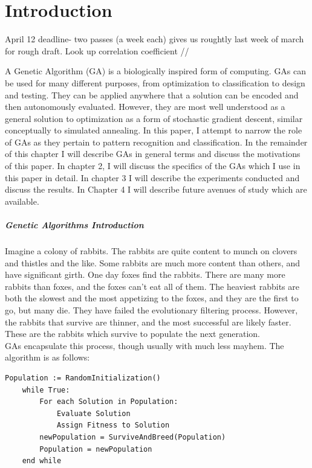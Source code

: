 \chapter{Introduction} \label{ch:introduction}

April 12 deadline- two passes (a week each) gives us roughtly last week of march for rough draft.  Look up correlation coefficient //

A Genetic Algorithm (GA) is a biologically inspired form of computing.  GAs can be used for many different purposes, from optimization to classification to design and testing.  They can be applied anywhere that a solution can be encoded and then autonomously evaluated.  However, they are most well understood as a general solution to optimization as a form of stochastic gradient descent, similar conceptually to simulated annealing. In this paper, I attempt to narrow the role of GAs as they pertain to pattern recognition and classification.  In the remainder of this chapter I will describe GAs in general terms and discuss the motivations of this paper.  In chapter 2, I will discuss the specifics of the GAs which I use in this paper in detail.  In chapter 3 I will describe the experiments conducted and discuss the results.  In Chapter 4 I will describe future avenues of study which are available. 
\paragraph{Genetic Algorithms Introduction}
Imagine a colony of rabbits.  The rabbits are quite content to munch on clovers and thistles and the like.  Some rabbits are much more content than others, and have significant girth.  One day foxes find the rabbits. There are many more rabbits than foxes, and the foxes can't eat all of them.  The heaviest rabbits are both the slowest and the most appetizing to the foxes, and they are the first to go, but many die.  They have failed the evolutionary filtering process.  However, the rabbits that survive are thinner, and the most successful are likely faster.  These are the rabbits which survive to populate the next generation.
\\GAs encapsulate this process, though usually with much less mayhem.  The algorithm is as follows:
\begin{lstlisting}[language = algorithm]
Population := RandomInitialization()
	while True:
		For each Solution in Population:
			Evaluate Solution
			Assign Fitness to Solution
		newPopulation = SurviveAndBreed(Population)
		Population = newPopulation
	end while
\end{lstlisting}

